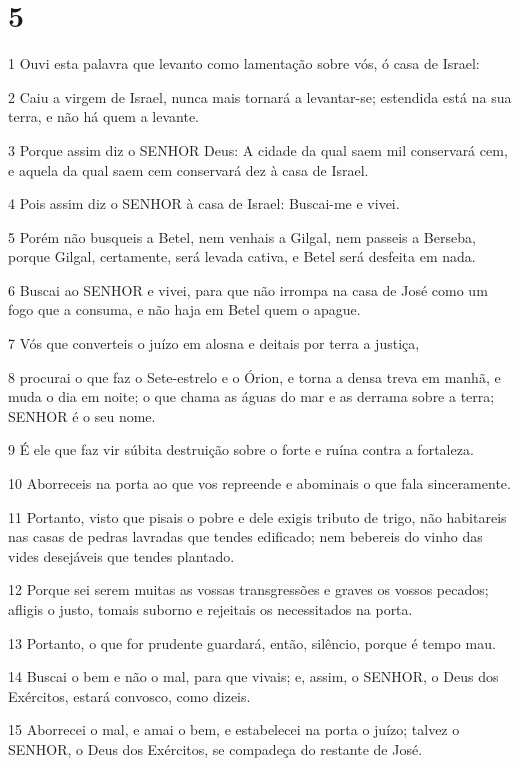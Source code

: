 \chapter{5}

\par 1 Ouvi esta palavra que levanto como lamentação sobre vós, ó casa de Israel:
\par 2 Caiu a virgem de Israel, nunca mais tornará a levantar-se; estendida está na sua terra, e não há quem a levante.
\par 3 Porque assim diz o SENHOR Deus: A cidade da qual saem mil conservará cem, e aquela da qual saem cem conservará dez à casa de Israel.
\par 4 Pois assim diz o SENHOR à casa de Israel: Buscai-me e vivei.
\par 5 Porém não busqueis a Betel, nem venhais a Gilgal, nem passeis a Berseba, porque Gilgal, certamente, será levada cativa, e Betel será desfeita em nada.
\par 6 Buscai ao SENHOR e vivei, para que não irrompa na casa de José como um fogo que a consuma, e não haja em Betel quem o apague.
\par 7 Vós que converteis o juízo em alosna e deitais por terra a justiça,
\par 8 procurai o que faz o Sete-estrelo e o Órion, e torna a densa treva em manhã, e muda o dia em noite; o que chama as águas do mar e as derrama sobre a terra; SENHOR é o seu nome.
\par 9 É ele que faz vir súbita destruição sobre o forte e ruína contra a fortaleza.
\par 10 Aborreceis na porta ao que vos repreende e abominais o que fala sinceramente.
\par 11 Portanto, visto que pisais o pobre e dele exigis tributo de trigo, não habitareis nas casas de pedras lavradas que tendes edificado; nem bebereis do vinho das vides desejáveis que tendes plantado.
\par 12 Porque sei serem muitas as vossas transgressões e graves os vossos pecados; afligis o justo, tomais suborno e rejeitais os necessitados na porta.
\par 13 Portanto, o que for prudente guardará, então, silêncio, porque é tempo mau.
\par 14 Buscai o bem e não o mal, para que vivais; e, assim, o SENHOR, o Deus dos Exércitos, estará convosco, como dizeis.
\par 15 Aborrecei o mal, e amai o bem, e estabelecei na porta o juízo; talvez o SENHOR, o Deus dos Exércitos, se compadeça do restante de José.
